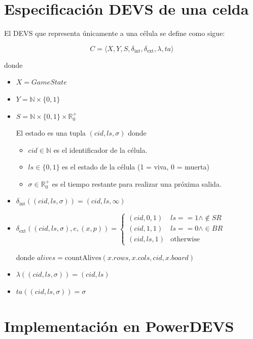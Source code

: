 \documentclass[]{article}
\newcommand{\dint}{\delta_{\text{int}}}
\newcommand{\dext}{\delta_{\text{ext}}}
\newcommand{\estado}{(cid,ls,\sigma)}
\newcommand{\R}{\mathbb{R}}
\newcommand{\N}{\mathbb{N}}
\begin{document}
\section{Especificación DEVS de una celda}

El DEVS que representa únicamente a una célula se define como sigue:

\[ C = \langle X, Y, S, \dint, \dext, \lambda, ta \rangle \]

donde

\begin{itemize}
  \item $X = GameState $

  \item $Y = \N \times \{0,1\}$

  \item $S = \N \times \{0, 1\} \times   \R_0^+$

    El estado es una tupla $(cid, ls, \sigma)$ donde

    \begin{itemize}
      \item $cid \in \N$ es el identificador de la célula.
      \item $ls \in \{0, 1\}$ es el estado de la célula (1 = viva, 0 = muerta)
      \item $\sigma \in \R_0^+$ es el tiempo restante para realizar una próxima salida.
    \end{itemize}

  \item $\dint(\estado) = (cid,ls,\infty)$


  \item $\dext(\estado, e, (x, p)) = \begin{cases}
    (cid,0,1) & ls == 1 \land \not \in SR  \\
    (cid,1,1) & ls == 0 \land \in BR \\
    (cid,ls,1) & \text{otherwise }
  \end{cases}$

    donde $alives = \text{countAlives}(x.rows,x.cols,cid,x.board)$
  \item $\lambda(\estado) = (cid,ls) $
  \item $ta(\estado) = \sigma$
\end{itemize}



\section{Implementación en PowerDEVS}
\end{document}
